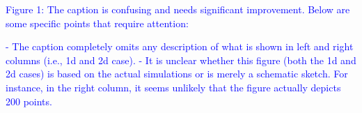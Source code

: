 \documentclass[
]{article}
\begin{document}

\textcolor{blue}{Figure 1: The caption is confusing and needs significant improvement.
Below are some specific points that require attention:}

\textcolor{blue}{- The caption completely omits any description of what is shown in left and right columns (i.e., 1d and 2d case).}
\textcolor{blue}{- It is unclear whether this figure (both the 1d and 2d cases) is based on the actual simulations or is merely a schematic sketch.
For instance, in the right column, it seems unlikely that the figure actually depicts 200 points.}
\end{document}
